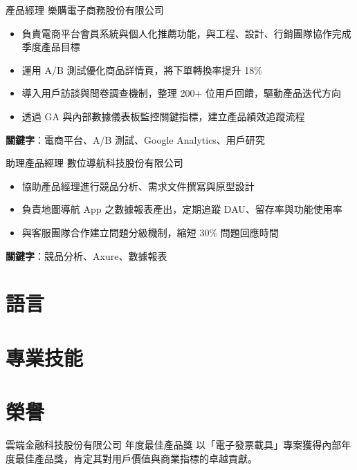 \documentclass[a4paper, serif, 10pt]{moderncv}
\begin{document}
        {產品經理}
        {樂購電子商務股份有限公司}
        {}
        {}
        {\begin{itemize}
\item 負責電商平台會員系統與個人化推薦功能，與工程、設計、行銷團隊協作完成季度產品目標
\item 運用 A/B 測試優化商品詳情頁，將下單轉換率提升 18\%
\item 導入用戶訪談與問卷調查機制，整理 200+ 位用戶回饋，驅動產品迭代方向
\item 透過 GA 與內部數據儀表板監控關鍵指標，建立產品績效追蹤流程
\end{itemize}
\textbf{關鍵字}：電商平台、A/B 測試、Google Analytics、用戶研究}

        {助理產品經理}
        {數位導航科技股份有限公司}
        {}
        {}
        {\begin{itemize}
\item 協助產品經理進行競品分析、需求文件撰寫與原型設計
\item 負責地圖導航 App 之數據報表產出，定期追蹤 DAU、留存率與功能使用率
\item 與客服團隊合作建立問題分級機制，縮短 30\% 問題回應時間
\end{itemize}
\textbf{關鍵字}：競品分析、Axure、數據報表}
\section{語言}

\section{專業技能}

\section{榮譽}

        {雲端金融科技股份有限公司}
        {年度最佳產品獎}
        {}
        {}
        {以「電子發票載具」專案獲得內部年度最佳產品獎，肯定其對用戶價值與商業指標的卓越貢獻。}
\end{document}

